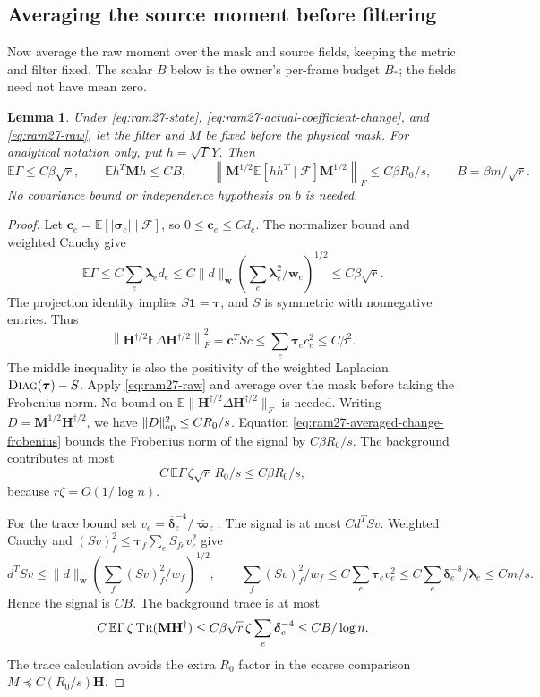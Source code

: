\documentclass[11pt]{article}
\newtheorem{lemma}[theorem]{Lemma}
\theoremstyle{remark}
\newcommand{\HH}{\mathbf H}
\newcommand{\cc}{\mathbf c}
\newcommand{\llambda}{\boldsymbol{\lambda}}
\newcommand{\ttau}{\boldsymbol{\tau}}
\newcommand{\ww}{\mathbf w}
\newcommand{\vvpbar}{\overline{\boldsymbol{\varpi}}}
\newcommand{\ssigma}{\boldsymbol{\sigma}}
\newcommand{\MM}{\mathbf M}
\newcommand{\ddelta}{\boldsymbol{\delta}}
\newcommand{\ddeltabar}{\overline{\boldsymbol{\delta}}}
\newcommand{\diag}{\textsc{Diag}}
\newcommand{\Ex}{\mathbb E}
\newcommand{\norm}[1]{\lVert#1\rVert}
\newcommand{\tr}{\textsc{Tr}}
\begin{document}
\subsection{Averaging the source moment before filtering}

Now average the raw moment over the mask and source fields, keeping the metric
and filter fixed.
The scalar $B$ below is the owner's per-frame budget $B_*$; the fields need not
have mean zero.

\begin{lemma}\label{lem:ram27-averaged}
Under \eqref{eq:ram27-state}, \eqref{eq:ram27-actual-coefficient-change}, and
\eqref{eq:ram27-raw}, let the filter and $M$ be fixed before the physical mask.
For analytical notation only, put $h=\sqrt\Gamma Y$.
Then
\begin{equation}\label{eq:ram27-averaged-bounds}
 \Ex\Gamma\le C\beta\sqrt r,\qquad
 \Ex h^T\MM h\le C B,\qquad
 \left\norm{\MM^{1/2}\Ex[hh^T\mid\mathcal F]\MM^{1/2}\right}_F
        \le C\beta R_0/s,\qquad B=\beta m/\sqrt r .
\end{equation}
No covariance bound or independence hypothesis on $b$ is needed.
\end{lemma} \begin{proof} Let $\cc_e=\Ex[|\ssigma_e|\mid\mathcal F]$, so $0\le \cc_e\le
Cd_e$.
The normalizer bound and weighted Cauchy give
\[
 \Ex\Gamma\le C\sum_e\llambda_ed_e
 \le C\norm{d}_{\ww}\left(\sum_e\llambda_e^2/\ww_e\right)^{1/2}
 \le C\beta\sqrt r .
\]
The projection identity implies $S\mathbf1=\ttau$, and $S$ is symmetric with
nonnegative entries.
Thus
\[
 \left\norm{\HH^{\dagger/2}\Ex\Delta \HH^{\dagger/2}\right}_F^2
   =\cc^TSc\le\sum_e\ttau_ec_e^2\le C\beta^2 .             \tag{O6}\label{eq:ram27-averaged-change-frobenius}
\]
The middle inequality is also the positivity of the weighted Laplacian
$\diag(\ttau)-S$.
Apply \eqref{eq:ram27-raw} and average over the mask before taking the Frobenius
norm.
No bound on $\Ex\norm{\HH^{\dagger/2}\Delta \HH^{\dagger/2}}_F$ is needed.
Writing $D=\MM^{1/2}\HH^{\dagger/2}$, we have $\norm{D}_{\rm op}^2\le CR_0/s$.
Equation \eqref{eq:ram27-averaged-change-frobenius} bounds the Frobenius norm of
the signal by $C\beta R_0/s$.
The background contributes at most
\[
 C\,\Ex\Gamma\,\zeta\sqrt r\,R_0/s
        \le C\beta R_0/s,
\]
because $r\zeta=O(1/\log n)$.

For the trace bound set $v_e=\ddeltabar_e^{-4}/\vvpbar_e$.
The signal is at most $C d^TSv$.
Weighted Cauchy and $(Sv)_f^2\le\ttau_f\sum_eS_{fe}v_e^2$ give
\[
 d^TSv\le\norm{d}_{\ww}
       \left(\sum_f(Sv)_f^2/w_f\right)^{1/2},
 \qquad
 \sum_f(Sv)_f^2/w_f
   \le C\sum_e\ttau_ev_e^2
   \le C\sum_e\ddelta_e^{-8}/\llambda_e
   \le Cm/s .
\]
Hence the signal is $CB$.
The background trace is at most
\[
 C\,\Ex\Gamma\,\zeta\,\tr(\MM\HH^\dagger)
 \le C\beta\sqrt r\,\zeta\sum_e\ddelta_e^{-4}
 \le CB/\log n .
\]
The trace calculation avoids the extra $R_0$ factor in the coarse comparison
$M\preceq C(R_0/s)\HH$.
\end{proof}
\end{document}
